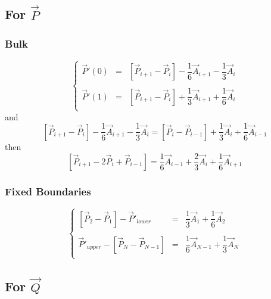 \documentclass[aps,12pt]{revtex4}
\begin{document}
\subsection{For $\vec{P}$}

\subsubsection{Bulk}

\begin{equation}
\left\lbrace
\begin{array}{rcl}
	\vec{P}'(0) & = & \left[\vec{P}_{i+1}-\vec{P}_i\right] - \dfrac{1}{6} \vec{A}_{i+1} - \dfrac{1}{3}\vec{A}_{i} \\
	\\
	\vec{P}'(1) & = & \left[\vec{P}_{i+1}-\vec{P}_i\right] + \dfrac{1}{3} \vec{A}_{i+1} + \dfrac{1}{6}\vec{A}_{i}\\
\end{array}
\right.
\end{equation}
and
\begin{equation}
	 \left[\vec{P}_{i+1}-\vec{P}_i\right] - \dfrac{1}{6} \vec{A}_{i+1} - \dfrac{1}{3}\vec{A}_{i}
	 =
	 \left[\vec{P}_{i}-\vec{P}_{i-1}\right] + \dfrac{1}{3} \vec{A}_{i} + \dfrac{1}{6}\vec{A}_{i-1}
\end{equation}
then
\begin{equation}
	 \left[\vec{P}_{i+1}-2\vec{P}_i+\vec{P}_{i-1}\right] = \dfrac{1}{6} \vec{A}_{i-1} + \dfrac{2}{3}\vec{A}_{i} + \dfrac{1}{6} \vec{A}_{i+1}
\end{equation}

\subsubsection{Fixed Boundaries}
 
\begin{equation}
\left\lbrace
\begin{array}{rcl}
 	 \left[\vec{P}_{2}-\vec{P}_1\right] - \vec{P}'_{lower}& = &\dfrac{1}{3} \vec{A}_1 + \dfrac{1}{6} \vec{A}_{2}\\
	 \\
	\vec{P}'_{upper} - \left[\vec{P}_N - \vec{P}_{N-1}\right] & = & \dfrac{1}{6} \vec{A}_{N-1} + \dfrac{1}{3} \vec{A}_{N}\\
\end{array}
\right.
\end{equation}
 
 
\subsection{For $\vec{Q}$}
\end{document}
